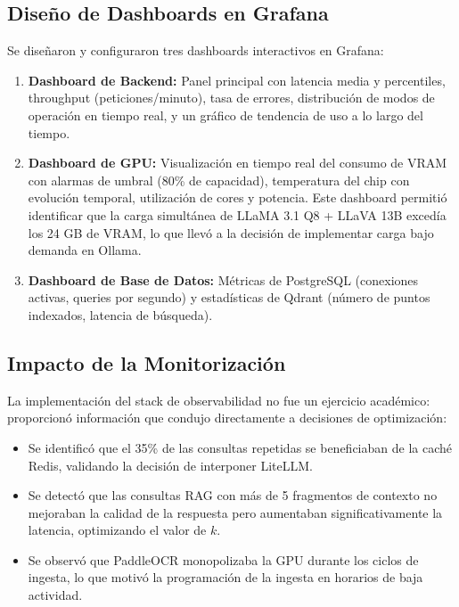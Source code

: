 \subsection{Diseño de Dashboards en Grafana}

Se diseñaron y configuraron tres dashboards interactivos en Grafana:

\begin{enumerate}
    \item \textbf{Dashboard de Backend:} Panel principal con latencia media y percentiles, throughput (peticiones/minuto), tasa de errores, distribución de modos de operación en tiempo real, y un gráfico de tendencia de uso a lo largo del tiempo.

    \item \textbf{Dashboard de GPU:} Visualización en tiempo real del consumo de VRAM con alarmas de umbral (80\% de capacidad), temperatura del chip con evolución temporal, utilización de cores y potencia. Este dashboard permitió identificar que la carga simultánea de LLaMA 3.1 Q8 + LLaVA 13B excedía los 24 GB de VRAM, lo que llevó a la decisión de implementar carga bajo demanda en Ollama.

    \item \textbf{Dashboard de Base de Datos:} Métricas de PostgreSQL (conexiones activas, queries por segundo) y estadísticas de Qdrant (número de puntos indexados, latencia de búsqueda).
\end{enumerate}

\subsection{Impacto de la Monitorización}

La implementación del stack de observabilidad no fue un ejercicio académico: proporcionó información que condujo directamente a decisiones de optimización:

\begin{itemize}
    \item Se identificó que el 35\% de las consultas repetidas se beneficiaban de la caché Redis, validando la decisión de interponer LiteLLM.
    \item Se detectó que las consultas RAG con más de 5 fragmentos de contexto no mejoraban la calidad de la respuesta pero aumentaban significativamente la latencia, optimizando el valor de $k$.
    \item Se observó que PaddleOCR monopolizaba la GPU durante los ciclos de ingesta, lo que motivó la programación de la ingesta en horarios de baja actividad.
\end{itemize}

